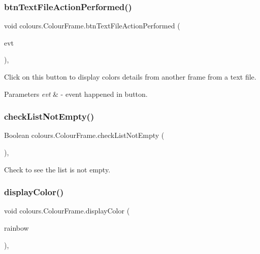 \subsubsection{\texorpdfstring{btn\+Text\+File\+Action\+Performed()}{btnTextFileActionPerformed()}}
{\footnotesize\ttfamily void colours.\+Colour\+Frame.\+btn\+Text\+File\+Action\+Performed (\begin{DoxyParamCaption}\item[{java.\+awt.\+event.\+Action\+Event}]{evt }\end{DoxyParamCaption})\hspace{0.3cm}{\ttfamily [inline]}, {\ttfamily [private]}}

Click on this button to display colors details from another frame from a text file. 
\begin{DoxyParams}{Parameters}
{\em evt} & -\/ event happened in button. \\
\hline
\end{DoxyParams}
\mbox{\label{classcolours_1_1_colour_frame_a693e820f5c6ea43ce0a862bd751f42c3}} 
\subsubsection{\texorpdfstring{check\+List\+Not\+Empty()}{checkListNotEmpty()}}
{\footnotesize\ttfamily Boolean colours.\+Colour\+Frame.\+check\+List\+Not\+Empty (\begin{DoxyParamCaption}{ }\end{DoxyParamCaption})\hspace{0.3cm}{\ttfamily [inline]}, {\ttfamily [private]}}

Check to see the list is not empty. \mbox{\label{classcolours_1_1_colour_frame_a97c8597f65a97de8993a1ab05d39dd44}} 
\subsubsection{\texorpdfstring{display\+Color()}{displayColor()}}
{\footnotesize\ttfamily void colours.\+Colour\+Frame.\+display\+Color (\begin{DoxyParamCaption}\item[{List$<$ \hyperlink{classcolours_1_1_color_rainbow}{Color\+Rainbow} $>$}]{rainbow }\end{DoxyParamCaption})\hspace{0.3cm}{\ttfamily [inline]}, {\ttfamily [private]}}

